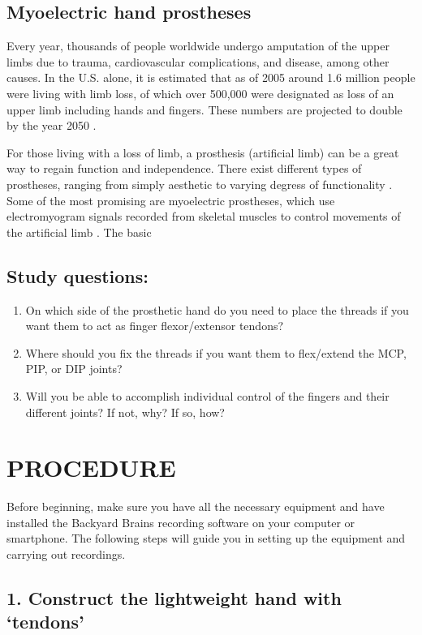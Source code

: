 \documentclass[12pt]{article}
\begin{document}
\subsection*{Myoelectric hand prostheses}
Every year, thousands of people worldwide undergo amputation of the upper limbs due to trauma, cardiovascular complications, and disease, among other causes. In the U.S. alone, it is estimated that as of 2005 around 1.6 million people were living with limb loss, of which over 500,000 were designated as loss of an upper limb including hands and fingers. These numbers are projected to double by the year 2050 \citep{ziegler2008estimating}. 

For those living with a loss of limb, a prosthesis (artificial limb) can be a great way to regain function and independence. There exist different types of prostheses, ranging from simply aesthetic to varying degress of functionality \citep{maat2018passive,ten20173d}. Some of the most promising are myoelectric prostheses, which use electromyogram signals recorded from skeletal muscles to control movements of the artificial limb \citep{geethanjali2016myoelectric}. The basic 


\subsection*{Study questions:}

\begin{enumerate}
    \item On which side of the prosthetic hand do you need to place the threads if you want them to act as finger flexor/extensor tendons?
    \item Where should you fix the threads if you want them to flex/extend the MCP, PIP, or DIP joints?
    \item Will you be able to accomplish individual control of the fingers and their different joints? If not, why? If so, how?
\end{enumerate}

\section*{PROCEDURE}

Before beginning, make sure you have all the necessary equipment and have installed the Backyard Brains recording software on your computer or smartphone. The following steps will guide you in setting up the equipment and carrying out recordings.

\subsection*{1. Construct the lightweight hand with `tendons'}
\end{document}
